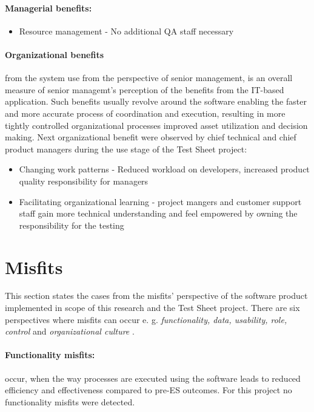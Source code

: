 \paragraph{Managerial benefits:}
\begin{itemize}
	\item Resource management - No additional QA staff necessary
\end{itemize}


\paragraph{Organizational benefits} from the system use from the perspective of senior management, is an overall measure of senior managemt's perception of the benefits from the IT-based application. Such benefits usually revolve around the software enabling the faster and more accurate process of coordination and execution, resulting in more tightly controlled organizational processes improved asset utilization and decision making. \cite{MES11} 
Next organizational benefit were observed by chief technical and chief product managers during the use stage of the Test Sheet project:

\begin{itemize}
	\item Changing work patterns - Reduced workload on developers, increased product quality responsibility for managers
	\item Facilitating organizational learning - project mangers and customer support staff gain more technical understanding and feel empowered by owning the responsibility for the testing
\end{itemize}



\section{Misfits}
This section states the cases from the misfits' perspective of the software product implemented in scope of this research and the Test Sheet project. There are six perspectives where misfits can occur e. g. \textit{functionality, data, usability, role, control} and \textit{organizational culture} \cite{MES10}.

\paragraph{Functionality misfits:} occur, when the way processes are executed using the software leads to reduced efficiency and effectiveness compared to pre-ES outcomes. For this project no functionality misfits were detected.

